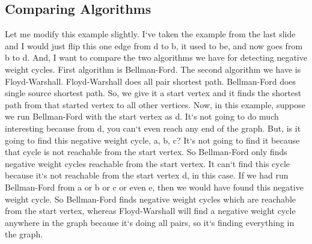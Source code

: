 \subsection{Comparing Algorithms}
Let me modify this example slightly.
I`ve taken the example from the last slide and I would just flip this one edge from d to b, it used to be, and now goes from b to d.
And, I want to compare the two algorithms we have for detecting negative weight cycles.
First algorithm is Bellman-Ford.
The second algorithm we have is Floyd-Warshall.
Floyd-Warshall does all pair shortest path.
Bellman-Ford does single source shortest path.
So, we give it a start vertex and it finds the shortest path from that started vertex to all other vertices.
Now, in this example, suppose we run Bellman-Ford with the start vertex as d.
It`s not going to do much interesting because from d, you can`t even reach any end of the graph.
But, is it going to find this negative weight cycle, a, b, c? It`s not going to find it because that cycle is not reachable from the start vertex.
So Bellman-Ford only finds negative weight cycles reachable from the start vertex.
It can`t find this cycle because it`s not reachable from the start vertex d, in this case.
If we had run Bellman-Ford from a or b or c or even e, then we would have found this negative weight cycle.
So Bellman-Ford finds negative weight cycles which are reachable from the start vertex, whereas Floyd-Warshall will find a negative weight cycle anywhere in the graph because it`s doing all pairs, so it`s finding everything in the graph.

